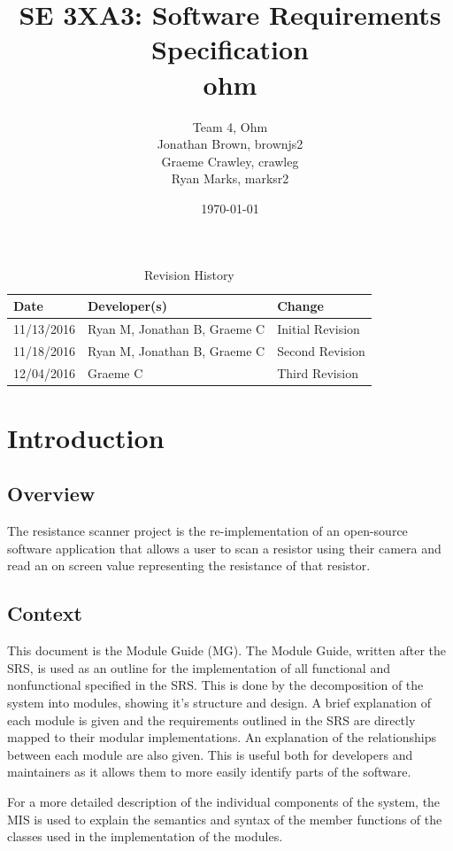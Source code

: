 \documentclass[12pt, titlepage]{article}
\title{SE 3XA3: Software Requirements Specification\\ ohm}
\author{Team 4, Ohm
		\\ Jonathan Brown, brownjs2
		\\ Graeme Crawley, crawleg
		\\ Ryan Marks, marksr2
}
\date{\today}
\begin{document}
\begin{table}[hp]
\caption{Revision History} \label{TblRevisionHistory}
\begin{tabularx}{\textwidth}{llX}
\toprule
\textbf{Date} & \textbf{Developer(s)} & \textbf{Change}\\
\midrule
11/13/2016 & Ryan M, Jonathan B, Graeme C & Initial Revision\\
11/18/2016 & Ryan M, Jonathan B, Graeme C & Second Revision\\
12/04/2016 & Graeme C & Third Revision\\
\bottomrule
\end{tabularx}
\end{table}


\newpage
{}
\tableofcontents
\listoftables
\listoffigures



\newpage


\section{Introduction}
\subsection{Overview}
The resistance scanner project is the re-implementation of an open-source software application that allows a user to scan a resistor using their camera and read an on screen value representing the resistance of that resistor.

\subsection{Context}
\par This document is the Module Guide (MG). The Module Guide, written after the SRS, is used as an outline for the implementation of all functional and nonfunctional specified in the SRS. This is done by the decomposition of the system into modules, showing it's structure and design. A brief explanation of each module is given and the requirements outlined in the SRS are directly mapped to their modular implementations. An explanation of the relationships between each module are also given. This is useful both for developers and maintainers as it allows them to more easily identify parts of the software.
\par For a more detailed description of the individual components of the system, the MIS is used to explain the semantics and syntax of the member functions of the classes used in the implementation of the modules.
\end{document}
